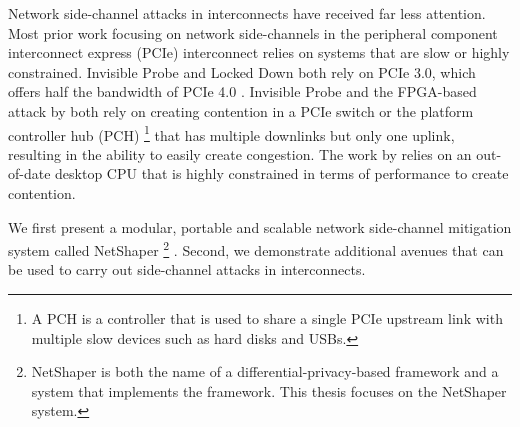 Network side-channel attacks in interconnects have received far less attention.
Most prior work focusing on network side-channels in the peripheral component interconnect express (PCIe) interconnect relies on systems that are slow or highly constrained.
Invisible Probe \cite{tan2021invisible} and Locked Down \cite{side2022lockeddown} both rely on PCIe 3.0, which offers half the bandwidth of PCIe 4.0 \cite{pcie_3_v_4}.
Invisible Probe \cite{tan2021invisible} and the FPGA-based attack by \citet{giechaskiel2022cross} both rely on creating contention in a PCIe switch or the platform controller hub (PCH) 
\footnote{A PCH is a controller that is used to share a single PCIe upstream link with multiple slow devices such as hard disks and USBs.}
that has multiple downlinks but only one uplink, resulting in the ability to easily create congestion.
The work by \citet{khaliq2021timing} relies on an out-of-date desktop CPU that is highly constrained in terms of performance to create contention.

We first present a modular, portable and scalable network side-channel mitigation system called NetShaper 
\footnote{NetShaper is both the name of a differential-privacy-based framework and a system that implements the framework. This thesis focuses on the NetShaper system.} \cite{sabzi2024netshaper}.
Second, we demonstrate additional avenues that can be used to carry out side-channel attacks in interconnects.


\begin{comment}


End-host modification (not scalable):
\cite{cai2014csbuflo, cherubin2017llama, luo2011httpos, smith2022qcsd, wang2017walkie}

Relies on only simulation or do not have any deployable implementation:
\cite{abusnaina2020dfd, beckerle2022splitting, cai2014tamaraw, gong2022surakav, hou2020wf, juarez2016wtfpad, nasr2021blind, rahman2020mockingbird, shan2021dolos, wang2014supersequence, wright2009morphing}

Not-adaptive to application requirements:
\cite{barradas2017deltashaper}

Not application agnostic:
\cite{cherubin2017llama, luo2011httpos}

Hard to deploy:
\cite{beckerle2022splitting, de2020trafficsliver}

\end{comment}